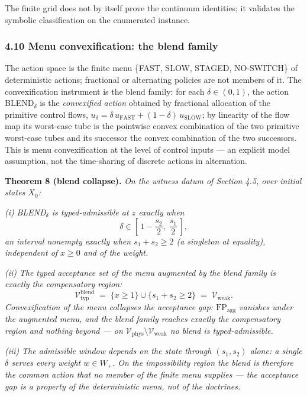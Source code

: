 \documentclass[11pt]{article}
\begin{document}
The finite grid does not by itself prove the continuum identities; it
validates the symbolic classification on the enumerated instance.

\subsubsection{4.10 Menu convexification: the blend
family}\label{menu-convexification-the-blend-family}

The action space is the finite menu \{FAST, SLOW, STAGED,
NO-SWITCH\} of deterministic actions; fractional or alternating policies
are not members of it. The convexification instrument is the blend
family: for each \(\delta \in (0,1)\), the action BLEND\(_\delta\) is
the \emph{convexified action} obtained by fractional allocation of the
primitive control flows,
\(u_\delta = \delta\, u_{\mathrm{FAST}} + (1-\delta)\, u_{\mathrm{SLOW}}\);
by linearity of the flow map its worst-case tube is the pointwise convex
combination of the two primitive worst-case tubes and its successor the
convex combination of the two successors. This is menu convexification
at the level of control inputs --- an explicit model assumption, not the
time-sharing of discrete actions in alternation.

\textbf{Theorem 8 (blend collapse).} \emph{On the witness datum of
Section 4.5, over initial states \(X_0\):}

\emph{(i)} \emph{BLEND\(_\delta\) is typed-admissible at \(z\) exactly
when}
\[\delta \in \left[\,1 - \frac{s_2}{2},\; \frac{s_1}{2}\,\right],\]
\emph{an interval nonempty exactly when \(s_1 + s_2 \ge 2\) (a singleton
at equality), independent of \(x \ge 0\) and of the weight.}

\emph{(ii)} \emph{The typed acceptance set of the menu augmented by the
blend family is exactly the compensatory region:}
\[\mathcal{V}_{\mathrm{typ}}^{\mathrm{blend}} \;=\; \{ x \ge 1 \} \cup \{ s_1 + s_2 \ge 2 \} \;=\; \mathcal{V}_{\mathrm{weak}}.\]
\emph{Convexification of the menu collapses the acceptance gap:
\(\mathrm{FP}_{\mathrm{agg}}\) vanishes under the augmented menu, and
the blend family reaches exactly the compensatory region and nothing
beyond --- on
\(\mathcal{V}_{\mathrm{phys}} \setminus \mathcal{V}_{\mathrm{weak}}\) no
blend is typed-admissible.}

\emph{(iii)} \emph{The admissible window depends on the state through
\((s_1, s_2)\) alone: a single \(\delta\) serves every weight
\(w \in W_+\). On the impossibility region the blend is therefore the
common action that no member of the finite menu supplies --- the
acceptance gap is a property of the deterministic menu, not of the
doctrines.}
\end{document}
